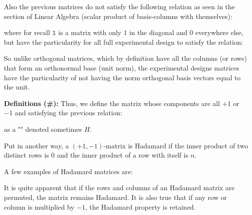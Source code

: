 	Also the previous matrices do not satisfy the following relation as seen in the section of Linear Algebra (scalar product of basis-columns with themselves):
	
	where for recall $\mathds{1}$ is a matrix with only $1$ in the diagonal and $0$ everywhere else, but have the particularity for all full experimental design to satisfy the relation:
	
	So unlike orthogonal matrices, which by definition have all the columns (or rows) that form an orthonormal base (unit norm), the experimental designs matrices have the particularity of not having the norm orthogonal basis vectors equal to the unit.
	
	\textbf{Definitions (\#\mydef):}
	Thus, we define the matrix whose components are all $+1$ or $-1$ and satisfying the previous relation:
		
	as a "" denoted sometimes $H$. 
	
	Put in another way, a $(+1,-1)$-matrix is Hadamard if the inner
product of two distinct rows is 0 and the inner product of a
row with itself is $n$.

	A few examples of Hadamard matrices are:
	
	It is quite apparent that if the rows and columns of an Hadamard matrix are permuted, the matrix remains Hadamard. It is also true that if any row or column is multiplied by $-1$, the Hadamard property is retained.


